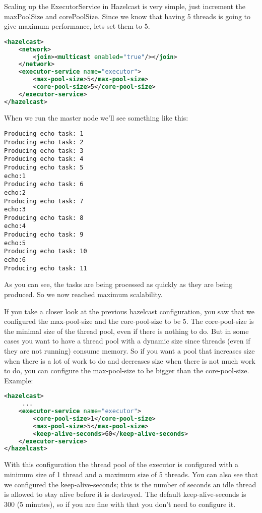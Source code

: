 Scaling up the ExecutorService in Hazelcast is very simple, just increment the maxPoolSize and corePoolSize. Since we know that having 5 threads is going to give maximum performance, lets set them to 5.
\begin{lstlisting}[language=xml]
<hazelcast>
    <network>
        <join><multicast enabled="true"/></join>
    </network>
    <executor-service name="executor">
        <max-pool-size>5</max-pool-size>
        <core-pool-size>5</core-pool-size>
    </executor-service>
</hazelcast>
\end{lstlisting}
When we run the master node we'll see something like this:
\begin{lstlisting}
Producing echo task: 1
Producing echo task: 2
Producing echo task: 3
Producing echo task: 4
Producing echo task: 5
echo:1
Producing echo task: 6
echo:2
Producing echo task: 7
echo:3
Producing echo task: 8
echo:4
Producing echo task: 9
echo:5
Producing echo task: 10
echo:6
Producing echo task: 11	
\end{lstlisting}
As you can see, the tasks are being processed as quickly as they are being produced. So we now reached maximum scalability.

If you take a closer look at the previous hazelcast configuration, you saw that we configured the max-pool-size and the core-pool-size to be 5. The core-pool-size is the minimal size of the thread pool, even if there is nothing to do. But in some cases you want to have a thread pool with a dynamic size since threads (even if they are not running) consume memory. So if you want a pool that increases size when there is a lot of work to do and decreases size when there is not much work to do, you can configure the max-pool-size to be bigger than the core-pool-size. Example:
\begin{lstlisting}[language=xml]
<hazelcast>
     ...  
    <executor-service name="executor">
        <core-pool-size>1</core-pool-size> 
        <max-pool-size>5</max-pool-size>
        <keep-alive-seconds>60</keep-alive-seconds>
    </executor-service>
</hazelcast>
\end{lstlisting}
With this configuration the thread pool of the executor is configured with a minimum size of 1 thread and a maximum size of 5 threads. You can also see that we configured the keep-alive-seconds; this is the number of seconds an idle thread is allowed to stay alive before it is destroyed. The default keep-alive-seconds is 300 (5 minutes), so if you are fine with that you don't need to configure it.

